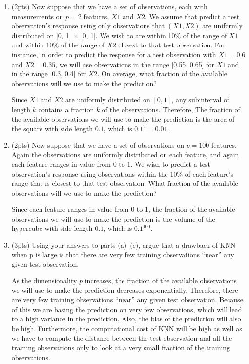 \documentclass[a4paper]{article}
\theoremstyle{definition}
\newenvironment{soln}{
    \leavevmode\color{blue}\ignorespaces
}{}
\begin{document}
\begin{enumerate}
\begin{enumerate}
	
	\item (2pts) Now suppose that we have a set of observations, each with measurements on $p =2$ features, $X1$ and $X2$. We assume that predict a test observation’s response using only observations that $(X1,X2)$ are uniformly distributed on [0, 1] × [0, 1]. We wish to are within 10\% of the range of $X1$ and within 10\% of the range of $X2$ closest to that test observation. For instance, in order to predict the response for a test observation with $X1 =0.6$ and $X2 =0.35$, we will use observations in the range [0.55, 0.65] for $X1$ and in the range [0.3, 0.4] for $X2$. On average, what fraction of the available observations will we use to make the prediction?
	
	\begin{soln} 
		Since $X1$ and $X2$ are uniformly distributed on $[0,1]$, any subinterval of length $k$ contains a fraction $k$ of the observations. Therefore, The fraction of the available observations we will use to make the prediction is the area of the square with side length $0.1$, which is $0.1^2 = 0.01$.
		
	\end{soln}
	
	\item (2pts) Now suppose that we have a set of observations on $p = 100$ features. Again the observations are uniformly distributed on each feature, and again each feature ranges in value from 0 to 1. We wish to predict a test observation’s response using observations within the 10\% of each feature’s range that is closest to that test observation. What fraction of the available observations will we use to make the prediction?
	
	\begin{soln} 
		Since each feature ranges in value from 0 to 1, the fraction of the available observations we will use to make the prediction is the volume of the hypercube with side length $0.1$, which is $0.1^{100}$.
	
	\end{soln}
	
	\item (3pts) Using your answers to parts (a)–(c), argue that a drawback of KNN when p is large is that there are very few training observations “near” any given test observation.
	
	\begin{soln} 
		As the dimensionality $p$ increases, the fraction of the available observations we will use to make the prediction decreases exponentially. Therefore, there are very few training observations “near” any given test observation. 	Because of this we are basing the prediction on very few observations, which will lead to a high variance in the prediction. Also, the bias of the prediction will also be high. Furthermore, the computational cost of KNN will be high as well as we have to compute the distance between the test observation and all the training observations only to look at a very small fraction of the training observations.
	

\end{soln}
\end{enumerate}
\end{enumerate}
\end{document}
